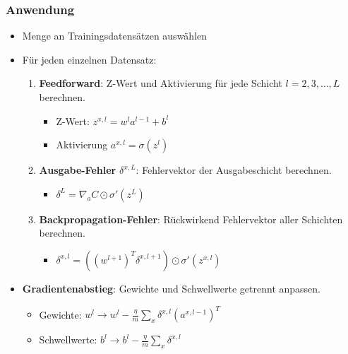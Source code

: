 \begin{frame}
\frametitle{Anwendung}

\begin{itemize}
\item Menge an Trainingsdatensätzen auswählen
\item Für jeden einzelnen Datensatz: 

\begin{enumerate}
\item \textbf{Feedforward}: Z-Wert und Aktivierung für jede Schicht $l = 2, 3, \ldots, L$ berechnen. 
\begin{itemize}
	\item Z-Wert: $z^{x,l} = w^l a^{l-1}+b^l$
	\item Aktivierung $a^{x,l} = \sigma(z^{l})$
\end{itemize}

\item \textbf{Ausgabe-Fehler} $\delta^{x,L}$: Fehlervektor der Ausgabeschicht berechnen.
\begin{itemize}
	\item $\delta^{L}  = \nabla_a C \odot \sigma'(z^L)$
\end{itemize}

\item \textbf{Backpropagation-Fehler}: Rückwirkend Fehlervektor aller Schichten berechnen.
\begin{itemize}
	\item $\delta^{x,l} = ((w^{l+1})^T \delta^{x,l+1}) \odot \sigma'(z^{x,l})$
\end{itemize}
\end{enumerate}

\item \textbf{Gradientenabstieg}: Gewichte und Schwellwerte getrennt anpassen. 
\begin{itemize}
	\item Gewichte: $w^l \rightarrow w^l-\frac{\eta}{m} \sum_x \delta^{x,l} (a^{x,l-1})^T$
	\item Schwellwerte: $b^l \rightarrow b^l-\frac{\eta}{m} \sum_x \delta^{x,l}$
\end{itemize}


\end{itemize}

\end{frame}
